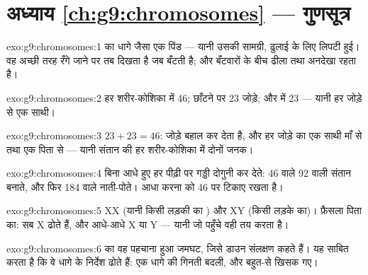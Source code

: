 \section*{अध्याय \ref{ch:g9:chromosomes} --- गुणसूत्र}

\begin{solution}{exo:g9:chromosomes:1}
 का धागे जैसा एक पिंड --- यानी उसकी सामग्री, ढुलाई के लिए लिपटी
हुई। वह अच्छी तरह रँगे जाने पर तब दिखता है जब  बँटती है; और
बँटवारों के बीच ढीला तथा अनदेखा रहता है।
\end{solution}

\begin{solution}{exo:g9:chromosomes:2}
हर शरीर-कोशिका में 46; छाँटने पर 23 जोड़े; और  में 23 --- यानी हर
जोड़े से एक साथी।
\end{solution}

\begin{solution}{exo:g9:chromosomes:3}
$23 + 23 = 46$:  जोड़े बहाल कर देता है, और हर जोड़े का एक साथी माँ
से तथा एक पिता से --- यानी संतान की हर शरीर-कोशिका में दोनों जनक।
\end{solution}

\begin{solution}{exo:g9:chromosomes:4}
बिना आधे हुए  हर पीढ़ी पर गड्डी दोगुनी कर देते: 46 वाले  92
वाली संतान बनाते, और फिर 184 वाले नाती-पोते। आधा करना  को 46 पर
टिकाए रखता है।
\end{solution}

\begin{solution}{exo:g9:chromosomes:5}
XX (यानी किसी लड़की का ) और XY (किसी लड़के का)। फ़ैसला
पिता का:  सब X ढोते हैं, और  आधे-आधे X या Y --- यानी जो
 पहुँचे वही तय करता है।
\end{solution}

\begin{solution}{exo:g9:chromosomes:6}
 का वह पहचाना हुआ जमघट, जिसे डाउन संलक्षण कहते हैं। यह साबित
करता है कि वे धागे  के निर्देश ढोते हैं: एक धागे की गिनती बदली, और
बहुत-से  खिसक गए।
\end{solution}

